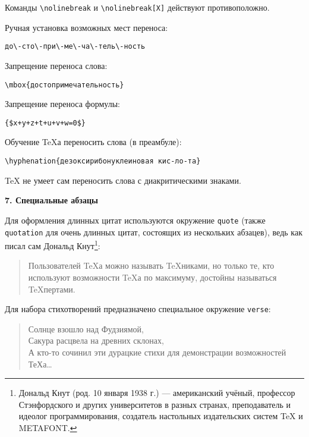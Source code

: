 \documentclass{article}
\begin{document}
\bigskip

Команды \verb"\nolinebreak" и \verb"\nolinebreak[X]" действуют противоположно.

\vspace{1cm}

Ручная установка возможных мест переноса:

\begin{center}
\verb"до\-сто\-при\-ме\-ча\-тель\-ность"
\end{center}

Запрещение переноса слова:

\begin{center}
\verb"\mbox{достопримечательность}"
\end{center}

Запрещение переноса формулы:

\begin{center}
\verb"{$x+y+z+t+u+v+w=0$}"
\end{center}

Обучение \TeX а переносить слова (в преамбуле):

\begin{center}
\verb"\hyphenation{дезоксирибонуклеиновая кис-ло-та}"
\end{center}

\TeX{} не умеет сам переносить слова с диакритическими знаками.


\newpage

\textbf{7. Специальные абзацы}

\bigskip

Для оформления длинных цитат используются окружение \texttt{quote} (также \texttt{quotation} для очень длинных цитат, состоящих из нескольких абзацев), ведь как писал сам Дональд Кнут\footnote{Дональд Кнут (род. 10 января 1938 г.) --- американский учёный, профессор Стэнфордского и других университетов в разных странах, преподаватель и идеолог программирования, создатель настольных издательских систем \TeX{} и METAFONT.}:
\begin{quote}
Пользователей \TeX а можно называть \TeX никами, но только те, кто используют возможности \TeX а по максимуму, достойны называться \TeX пертами.
\end{quote}

\vspace{2cm}

Для набора стихотворений предназначено специальное окружение \texttt{verse}:

\begin{verse}
Солнце взошло над Фудзиямой,\\
Сакура расцвела на древних склонах,\\
А кто-то сочинил эти дурацкие стихи для демонстрации возможностей ТеХа\ldots
\end{verse}
\end{document}
